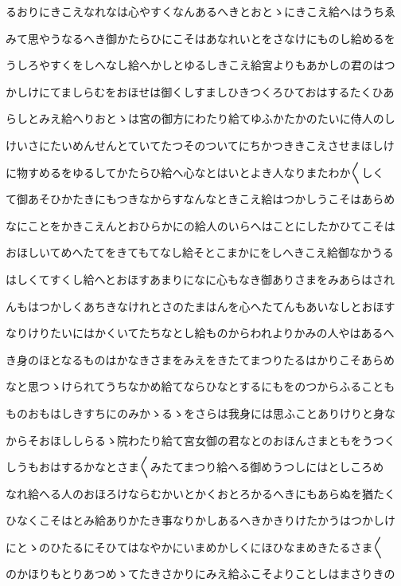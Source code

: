 \documentclass[a4paper,11pt,landscape]{ltjtarticle}
\begin{document}
るおりにきこえなれなは心やすくなんあるへきとおとゝにきこえ給へはうちゑ
\par\medskip
みて思やうなるへき御かたらひにこそはあなれいとをさなけにものし給めるを
\par\medskip
うしろやすくをしへなし給へかしとゆるしきこえ給宮よりもあかしの君のはつ
\par\medskip
かしけにてましらむをおほせは御くしすましひきつくろひておはするたくひあ
\par\medskip
らしとみえ給へりおとゝは宮の御方にわたり給てゆふかたかのたいに侍人のし
\par\medskip
けいさにたいめんせんとていてたつそのついてにちかつききこえさせまほしけ
\par\medskip
に物すめるをゆるしてかたらひ給へ心なとはいとよき人なりまたわか〱しく
\par\medskip
て御あそひかたきにもつきなからすなんなときこえ給はつかしうこそはあらめ
\par\medskip
なにことをかきこえんとおひらかにの給人のいらへはことにしたかひてこそは
\par\medskip
おほしいてめへたてをきてもてなし給そとこまかにをしへきこえ給御なかうる
\par\medskip
はしくてすくし給へとおほすあまりになに心もなき御ありさまをみあらはされ
\par\medskip
んもはつかしくあちきなけれとさのたまはんを心へたてんもあいなしとおほす
\par\medskip
なりけりたいにはかくいてたちなとし給ものからわれよりかみの人やはあるへ
\par\medskip
き身のほとなるものはかなきさまをみえをきたてまつりたるはかりこそあらめ
\par\medskip
なと思つゝけられてうちなかめ給てならひなとするにもをのつからふることも
\par\medskip
ものおもはしきすちにのみかゝるゝをさらは我身には思ふことありけりと身な
\par\medskip
からそおほししらるゝ院わたり給て宮女御の君なとのおほんさまともをうつく
\par\medskip
しうもおはするかなとさま〱みたてまつり給へる御めうつしにはとしころめ
\par\medskip
なれ給へる人のおほろけならむかいとかくおとろかるへきにもあらぬを猶たく
\par\medskip
ひなくこそはとみ給ありかたき事なりかしあるへきかきりけたかうはつかしけ
\par\medskip
にとゝのひたるにそひてはなやかにいまめかしくにほひなまめきたるさま〱
\par\medskip
のかほりもとりあつめゝてたきさかりにみえ給ふこそよりことしはまさりきの
\end{document}
